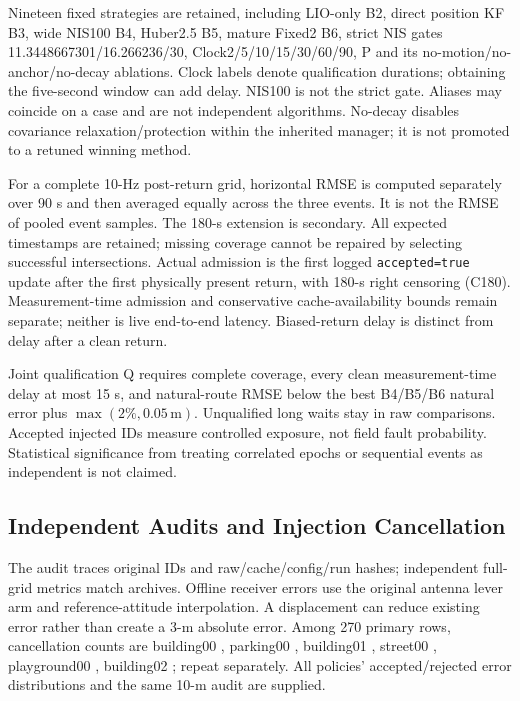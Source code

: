 \documentclass[conference]{IEEEtran}
\begin{document}
Nineteen fixed strategies are retained, including LIO-only B2, direct position KF B3, wide NIS100 B4, Huber2.5 B5, mature Fixed2 B6, strict NIS gates 11.3448667301/16.266236/30, Clock2/5/10/15/30/60/90, P and its no-motion/no-anchor/no-decay ablations. Clock labels denote qualification durations; obtaining the five-second window can add delay. NIS100 is not the strict gate. Aliases may coincide on a case and are not independent algorithms. No-decay disables covariance relaxation/protection within the inherited manager; it is not promoted to a retuned winning method.

For a complete 10-Hz post-return grid, horizontal RMSE is computed separately over 90 s and then averaged equally across the three events. It is not the RMSE of pooled event samples. The 180-s extension is secondary. All expected timestamps are retained; missing coverage cannot be repaired by selecting successful intersections. Actual admission is the first logged \texttt{accepted=true} update after the first physically present return, with 180-s right censoring (C180). Measurement-time admission and conservative cache-availability bounds remain separate; neither is live end-to-end latency. Biased-return delay is distinct from delay after a clean return.

Joint qualification Q requires complete coverage, every clean measurement-time delay at most 15 s, and natural-route RMSE below the best B4/B5/B6 natural error plus $\max(2\%,0.05\,\mathrm{m})$. Unqualified long waits stay in raw comparisons. Accepted injected IDs measure controlled exposure, not field fault probability. Statistical significance from treating correlated epochs or sequential events as independent is not claimed.

\subsection{Independent Audits and Injection Cancellation}
The audit traces original IDs and raw/cache/config/run hashes; independent full-grid metrics match archives. Offline receiver errors use the original antenna lever arm and reference-attitude interpolation. A displacement can reduce existing error rather than create a 3-m absolute error. Among 270 primary rows, cancellation counts are building00 , parking00 , building01 , street00 , playground00 , building02 ; repeat  separately. All policies' accepted/rejected error distributions and the same 10-m audit are supplied.
\end{document}
